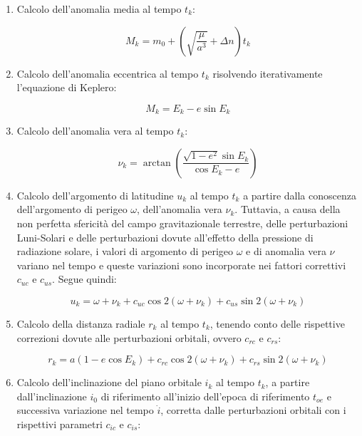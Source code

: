 \documentclass[a4paper,11pt,twoside]{book}
\begin{document}
\begin{itemize}[-]
\begin{enumerate}
			\item Calcolo dell'anomalia media al tempo $t_k$:
			
			\begin{equation}
				M_k = m_0 + \left( \sqrt{\frac{\mu}{a^3}} + \Delta n \right) t_k 
			\end{equation}
		
			\item Calcolo dell'anomalia eccentrica al tempo $t_k$ risolvendo iterativamente l'equazione di Keplero:
			
			\begin{equation}
				M_k = E_k - e \sin E_k
			\end{equation}
		
			\item Calcolo dell'anomalia vera al tempo $t_k$:
			
			\begin{equation}
				\nu_k = \arctan \left( \frac{\sqrt{1-e^2}\sin E_k}{\cos E_k - e} \right) 
			\end{equation}
			
			\item Calcolo dell'argomento di latitudine $u_k$ al tempo $t_k$ a partire dalla conoscenza dell'argomento di perigeo $\omega$, dell'anomalia vera $\nu_k$. Tuttavia, a causa della non perfetta sfericità del campo gravitazionale terrestre, delle perturbazioni Luni-Solari e delle perturbazioni dovute all'effetto della pressione di radiazione solare, i valori di argomento di perigeo $\omega$ e di anomalia vera $\nu$ variano nel tempo e queste variazioni sono incorporate nei fattori correttivi $c_{uc}$ e $c_{us}$. Segue quindi:
			
			\begin{equation}
				u_k = \omega + \nu_k + c_{uc} \cos 2(\omega + \nu_k) + c_{us} \sin 2(\omega + \nu_k)
			\end{equation}
		
		\item Calcolo della distanza radiale $r_k$ al tempo $t_k$, tenendo conto delle rispettive correzioni dovute alle perturbazioni orbitali, ovvero $c_{rc}$ e $c_{rs}$:
		
		\begin{equation}
			r_k = a(1-e \cos E_k ) + c_{rc} \cos 2(\omega + \nu_k) + c_{rs} \sin 2(\omega + \nu_k)
		\end{equation}
		
		\item Calcolo dell'inclinazione del piano orbitale $i_k$ al tempo $t_k$, a partire dall'inclinazione $i_0$ di riferimento all'inizio dell'epoca di riferimento $t_{oe}$ e successiva variazione nel tempo $\dot{i}$, corretta dalle perturbazioni orbitali con i rispettivi parametri $c_{ic}$ e $c_{is}$:
		

\end{enumerate}
\end{itemize}
\end{document}

